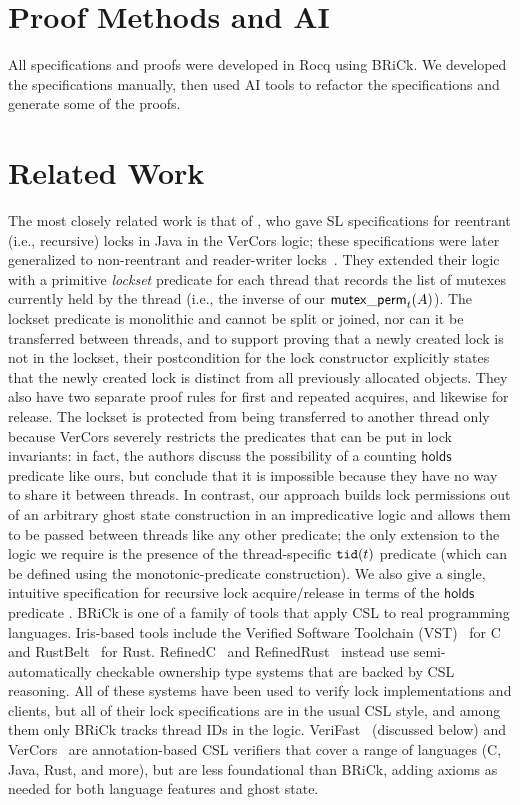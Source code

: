 \documentclass[acmsmall,screen,review,anonymous]{acmart}
\begin{document}
\section{Proof Methods and AI}
All specifications and proofs were developed in Rocq using BRiCk. We developed the specifications manually, then used AI tools to refactor the specifications and generate some of the proofs.

\section{Related Work}
The most closely related work is that of \citet{vercors-reentrant}, who gave SL specifications for reentrant (i.e., recursive) locks in Java in the VerCors logic; these specifications were later generalized to non-reentrant and reader-writer locks~\cite{vercors-locks}. They extended their logic with a primitive \emph{lockset} predicate for each thread that records the list of mutexes currently held by the thread (i.e., the inverse of our $\mathsf{mutex\_perm}_{t}(A)$). The lockset predicate is monolithic and cannot be split or joined, nor can it be transferred between threads, and to support proving that a newly created lock is not in the lockset, their postcondition for the lock constructor explicitly states that the newly created lock is distinct from all previously allocated objects. They also have two separate proof rules for first and repeated acquires, and likewise for release. The lockset is protected from being transferred to another thread only because VerCors severely restricts the predicates that can be put in lock invariants: in fact, the authors discuss the possibility of a counting $\mathsf{holds}$ predicate like ours, but conclude that it is impossible because they have no way to share it between threads. In contrast, our approach builds lock permissions out of an arbitrary ghost state construction in an impredicative logic and allows them to be passed between threads like any other predicate; the only extension to the logic we require is the presence of the thread-specific $\mathtt{tid}(t)$ predicate (which can be defined using the monotonic-predicate construction). We also give a single, intuitive specification for recursive lock acquire/release in terms of the $\mathsf{holds}$ predicate%
.
BRiCk is one of a family of tools that apply CSL to real programming languages. Iris-based tools include the Verified Software Toolchain (VST)~\cite{vst} for C and RustBelt~\cite{rustbelt} for Rust. RefinedC~\cite{refinedc} and RefinedRust~\cite{refinedrust} instead use semi-automatically checkable ownership type systems that are backed by CSL reasoning. All of these systems have been used to verify lock implementations and clients, but all of their lock specifications are in the usual CSL style, and among them only BRiCk tracks thread IDs in the logic. VeriFast~\cite{verifast} (discussed below) and VerCors~\cite{vercors} are annotation-based CSL verifiers that cover a range of languages (C, Java, Rust, and more), but are less foundational than BRiCk, adding axioms as needed for both language features and ghost state.
\end{document}
